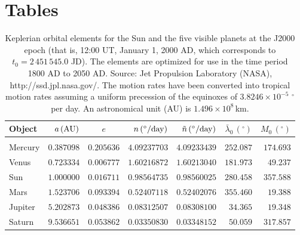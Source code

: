\section{Tables}

\begin{table}[h]\centering
\begin{tabular}{l|rcrrrr}
Object &  $a\,({\rm AU})$ & $e$ & $n\,(^\circ/{\rm day})$ & $\tilde{n}\,(^\circ/{\rm day})$ & $\bar{\lambda}_0\,(^\circ)$ & $M_0\,(^\circ)$\\\hline
&&&&&&\\[-2.2ex]
Mercury & $0.387098$  & $0.205636$ & $4.09237703$     & $4.09233439$    & $252.087$ & $174.693$  \\
Venus     & $0.723334$  & $0.006777$  & $1.60216872$    & $1.60213040$  & $181.973$ & $49.237$ \\
Sun       & $1.000000$  & $0.016711$  & $0.98564735$      & $0.98560025$  & $280.458$ & $357.588$   \\
Mars      & $1.523706$  & $0.093394$  & $0.52407118$     & $0.52402076$  & $355.460$ & $19.388$ \\ 
Jupiter   & $5.202873$  & $0.048386$  & $0.08312507$     & $0.08308100$    & $34.365$ & $19.348$\\
Saturn   & $9.536651$  & $0.053862$    & $0.03350830$     & $0.03348152$   & $50.059$ & $317.857$ \\
\end{tabular}
\caption{Keplerian orbital elements for the Sun and the five visible planets at the J2000 epoch (that is, 12:00 UT, January 1, 2000 AD,
which corresponds to $t_0 = 2\,451\,545.0$ JD). The elements are optimized for use in the
time period 1800 AD to 2050 AD. Source: Jet Propulsion Laboratory (NASA), {http://ssd.jpl.nasa.gov/}.  The motion rates have been converted into tropical motion rates assuming a uniform precession of the equinoxes
 of $3.8246\times 10^{-5}\,\,^\circ$ per day. An astronomical unit (AU) is $1.496\times 10^8$\,km.}\label{lt4}
\end{table}

